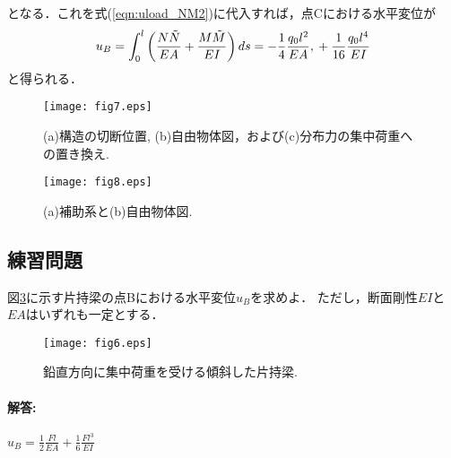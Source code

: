 ﻿\documentclass[10pt,a4j]{jarticle}
\begin{document}
となる．これを式(\ref{eqn:uload_NM2})に代入すれば，点Cにおける水平変位が
\begin{equation}
	u_B=
	\int_0^l \left( 
		\frac{N \tilde N }{EA}
		+
		\frac{M \tilde M }{EI}
	\right)
	ds 
	= 
	 -\frac{1}{4}\frac{q_0l^2}{EA}, \\
	 +\frac{1}{16}\frac{q_0l^4}{EI}
	\label{eqn:}
\end{equation}
と得られる．
\begin{figure}[h]
	\begin{center}
	\texttt{[image: fig7.eps]} 
	\end{center}
	\caption{(a)構造の切断位置, (b)自由物体図，および(c)分布力の集中荷重への置き換え.} 
	\label{fig:fig7}
\end{figure}
\begin{figure}[h]
	\begin{center}
	\texttt{[image: fig8.eps]} 
	\end{center}
	\caption{(a)補助系と(b)自由物体図.} 
	\label{fig:fig8}
\end{figure}
\subsection{練習問題}
図\ref{fig:fig6}に示す片持梁の点Bにおける水平変位$u_B$を求めよ．
ただし，断面剛性$EI$と$EA$はいずれも一定とする．
\begin{figure}[h]
	\begin{center}
	\texttt{[image: fig6.eps]} 
	\end{center}
	\caption{鉛直方向に集中荷重を受ける傾斜した片持梁.} 
	\label{fig:fig6}
\end{figure}
\paragraph{解答:}$u_B=\frac{1}{2}\frac{Fl}{EA} +\frac{1}{6}\frac{Fl^3}{EI}$
\end{document}
